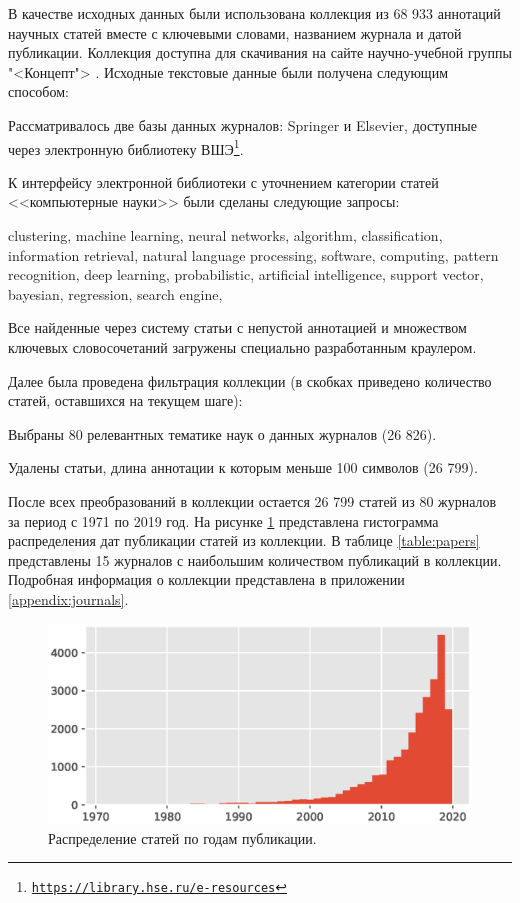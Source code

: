 \documentclass[12pt]{article}
\newenvironment{enumerate*}%
{\begin{enumerate}%
		\setlength{\itemsep}{0pt}%
		\setlength{\parskip}{0pt}}%
	{\end{enumerate}}
\newcommand{\hrefl}[1] {\texttt{\href{#1}{#1}}}
\begin{document}
В качестве исходных данных были использована коллекция из 68 933 аннотаций научных статей вместе с ключевыми словами, названием журнала и датой публикации. Коллекция доступна для скачивания на сайте научно-учебной группы "<Концепт"> \cite{concept_datasets}.
Исходные текстовые данные были получена следующим способом:
\begin{enumerate*}
	\item Рассматривалось две базы данных журналов: Springer и Elsevier, доступные через электронную библиотеку ВШЭ\footnote{\hrefl{https://library.hse.ru/e-resources}}.
	\item К интерфейсу электронной библиотеки с уточнением категории статей <<компьютерные науки>> были сделаны следующие запросы:
	
	\textsf{clustering, machine learning, neural networks, algorithm, classification, information retrieval, natural language processing, software, computing, pattern recognition, deep learning, probabilistic, artificial intelligence, support vector, bayesian, regression, search engine}, 
	
	\item Все найденные через систему статьи с непустой аннотацией и множеством ключевых словосочетаний загружены специально разработанным краулером.
\end{enumerate*}
Далее была проведена фильтрация коллекции (в скобках приведено количество статей, оставшихся на текущем шаге):
\begin{enumerate*}
	\item Выбраны 80 релевантных тематике наук о данных журналов (26 826).
	\item Удалены статьи, длина аннотации к которым меньше 100 символов (26 799).
\end{enumerate*}
После всех преобразований в коллекции остается 26 799 статей из 80 журналов за период с 1971 по 2019 год. На рисунке \ref{fig:papersdatehist} представлена гистограмма распределения дат публикации статей из коллекции. В таблице \ref{table:papers} представлены 15 журналов с наибольшим количеством публикаций в коллекции. Подробная информация о коллекции представлена в приложении \ref{appendix:journals}. 

\begin{figure}
	\centering
	\includegraphics[width=0.5\linewidth]{images/papers_date_hist}
	\caption{Распределение статей по годам публикации.}
	\label{fig:papersdatehist}
\end{figure}
\end{document}
